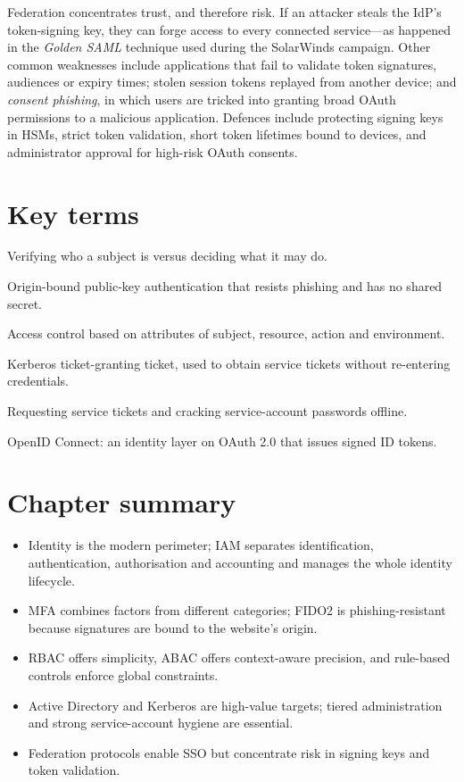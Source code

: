 Federation concentrates trust, and therefore risk. If an attacker steals the IdP's token-signing key, they can forge access to every connected service—as happened in the \emph{Golden SAML} technique used during the SolarWinds campaign. Other common weaknesses include applications that fail to validate token signatures, audiences or expiry times; stolen session tokens replayed from another device; and \emph{consent phishing}, in which users are tricked into granting broad OAuth permissions to a malicious application. Defences include protecting signing keys in HSMs, strict token validation, short token lifetimes bound to devices, and administrator approval for high-risk OAuth consents.

\section*{Key terms}
\begin{description}[style=nextline,leftmargin=1.2em]
  \item[Authentication vs. authorisation] Verifying who a subject is versus deciding what it may do.
  \item[FIDO2 / passkey] Origin-bound public-key authentication that resists phishing and has no shared secret.
  \item[ABAC] Access control based on attributes of subject, resource, action and environment.
  \item[TGT] Kerberos ticket-granting ticket, used to obtain service tickets without re-entering credentials.
  \item[Kerberoasting] Requesting service tickets and cracking service-account passwords offline.
  \item[OIDC] OpenID Connect: an identity layer on OAuth 2.0 that issues signed ID tokens.
\end{description}

\section*{Chapter summary}
\begin{itemize}
  \item Identity is the modern perimeter; IAM separates identification, authentication, authorisation and accounting and manages the whole identity lifecycle.
  \item MFA combines factors from different categories; FIDO2 is phishing-resistant because signatures are bound to the website's origin.
  \item RBAC offers simplicity, ABAC offers context-aware precision, and rule-based controls enforce global constraints.
  \item Active Directory and Kerberos are high-value targets; tiered administration and strong service-account hygiene are essential.
  \item Federation protocols enable SSO but concentrate risk in signing keys and token validation.
\end{itemize}

